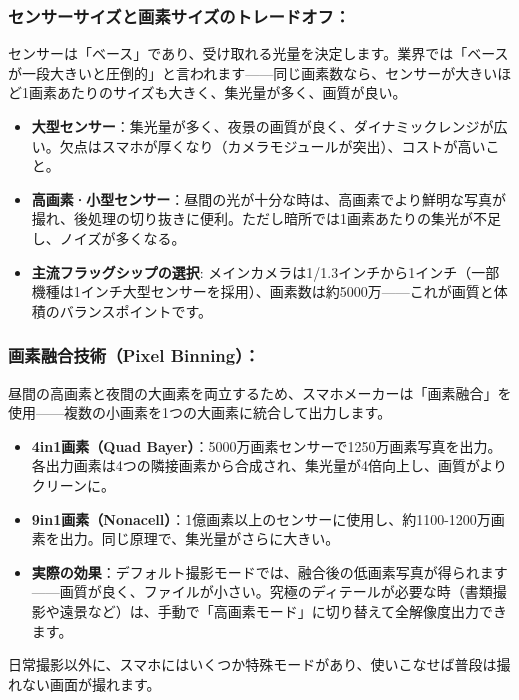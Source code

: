 \subsubsection*{センサーサイズと画素サイズのトレードオフ：}

センサーは「ベース」であり、受け取れる光量を決定します。業界では「ベースが一段大きいと圧倒的」と言われます——同じ画素数なら、センサーが大きいほど1画素あたりのサイズも大きく、集光量が多く、画質が良い。

\begin{itemize}
  \item \textbf{大型センサー}：集光量が多く、夜景の画質が良く、ダイナミックレンジが広い。欠点はスマホが厚くなり（カメラモジュールが突出）、コストが高いこと。
  \item \textbf{高画素·小型センサー}：昼間の光が十分な時は、高画素でより鮮明な写真が撮れ、後処理の切り抜きに便利。ただし暗所では1画素あたりの集光が不足し、ノイズが多くなる。
  \item \textbf{主流フラッグシップの選択}: メインカメラは1/1.3インチから1インチ（一部機種は1インチ大型センサーを採用）、画素数は約5000万——これが画質と体積のバランスポイントです。
\end{itemize}

\subsubsection*{画素融合技術（Pixel Binning）：}

昼間の高画素と夜間の大画素を両立するため、スマホメーカーは「画素融合」を使用——複数の小画素を1つの大画素に統合して出力します。

\begin{itemize}
  \item \textbf{4in1画素（Quad Bayer）}：5000万画素センサーで1250万画素写真を出力。各出力画素は4つの隣接画素から合成され、集光量が4倍向上し、画質がよりクリーンに。
  \item \textbf{9in1画素（Nonacell）}：1億画素以上のセンサーに使用し、約1100-1200万画素を出力。同じ原理で、集光量がさらに大きい。
  \item \textbf{実際の効果}：デフォルト撮影モードでは、融合後の低画素写真が得られます——画質が良く、ファイルが小さい。究極のディテールが必要な時（書類撮影や遠景など）は、手動で「高画素モード」に切り替えて全解像度出力できます。
\end{itemize}


日常撮影以外に、スマホにはいくつか特殊モードがあり、使いこなせば普段は撮れない画面が撮れます。

